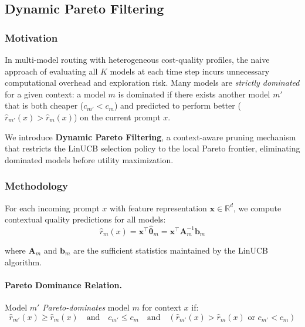 
\subsection{Dynamic Pareto Filtering}
\label{sec:dynamic_pareto_filtering}

\subsubsection{Motivation}
In multi-model routing with heterogeneous cost-quality profiles, the naive approach of evaluating all $K$ models at each time step incurs unnecessary computational overhead and exploration risk. Many models are \textit{strictly dominated} for a given context: a model $m$ is dominated if there exists another model $m'$ that is both cheaper ($c_{m'} < c_m$) and predicted to perform better ($\hat{r}_{m'}(x) > \hat{r}_m(x)$) on the current prompt $x$.

We introduce \textbf{Dynamic Pareto Filtering}, a context-aware pruning mechanism that restricts the LinUCB selection policy to the local Pareto frontier, eliminating dominated models before utility maximization.

\subsubsection{Methodology}

For each incoming prompt $x$ with feature representation $\mathbf{x} \in \mathbb{R}^d$, we compute contextual quality predictions for all models:
\begin{equation}
    \hat{r}_m(x) = \mathbf{x}^\top \hat{\boldsymbol{\theta}}_m = \mathbf{x}^\top \mathbf{A}_m^{-1} \mathbf{b}_m
\end{equation}

where $\mathbf{A}_m$ and $\mathbf{b}_m$ are the sufficient statistics maintained by the LinUCB algorithm.

\paragraph{Pareto Dominance Relation.}
Model $m'$ \textit{Pareto-dominates} model $m$ for context $x$ if:
\begin{equation}
    \hat{r}_{m'}(x) \geq \hat{r}_m(x) \quad \text{and} \quad c_{m'} \leq c_m \quad \text{and} \quad (\hat{r}_{m'}(x) > \hat{r}_m(x) \text{ or } c_{m'} < c_m)
\end{equation}


